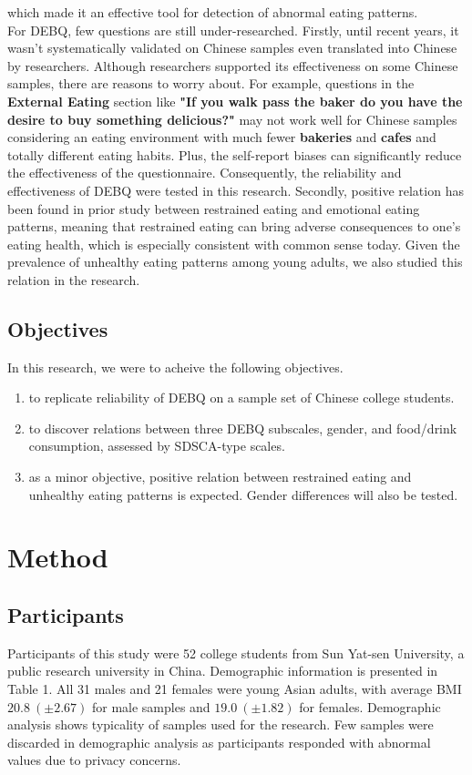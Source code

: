 \documentclass[letterpaper]{article}
\begin{document}
which made it an effective tool for detection of abnormal eating patterns. \\
\indent For DEBQ, few questions are still under-researched. Firstly, until recent years, it wasn't systematically validated on Chinese samples even translated into Chinese by researchers\cite{wu2017validation,wang2018psychometric}.
Although researchers supported its effectiveness on some Chinese samples, there are reasons to worry about. 
For example, questions in the \textbf{External Eating} section like \textbf{"If you walk pass the baker do you have the desire to buy something delicious?"} may not work well for 
Chinese samples considering an eating environment with much fewer \textbf{bakeries} and \textbf{cafes} and totally different eating habits. 
Plus, the self-report biases can significantly reduce the effectiveness of the questionnaire.
Consequently, the reliability and effectiveness of DEBQ were tested in this research.
Secondly, positive relation has been found in prior study between restrained eating and emotional eating patterns\cite{van1986predictive,wardle1987eating,macht2002chocolate}, 
meaning that restrained eating can bring adverse consequences to one's eating health, which is especially consistent with common sense today.
Given the prevalence of unhealthy eating patterns among young adults\cite{neumark2011dieting}, we also studied
this relation in the research. 

\subsection{Objectives}
In this research, we were to acheive the following objectives.
\begin{enumerate}
    \item to replicate reliability of DEBQ on a sample set of Chinese college students.
    \item to discover relations between three DEBQ subscales, gender, and food/drink consumption, assessed by SDSCA-type scales.
    \item as a minor objective, positive relation between restrained eating and unhealthy eating patterns 
          is expected. Gender differences will also be tested. 
\end{enumerate}

\section{Method}
\subsection{Participants} 
Participants of this study were 52 college students from Sun Yat-sen University, a public research university 
in China. Demographic information is presented in Table 1. All 31 males and 21 females
were young Asian adults, with average BMI \(20.8~(\pm 2.67)\) for male samples and \(19.0~(\pm 1.82)\) for females.
Demographic analysis shows typicality of samples used for the research.
Few samples were discarded in demographic analysis as participants responded with abnormal values due to privacy concerns.
\end{document}

